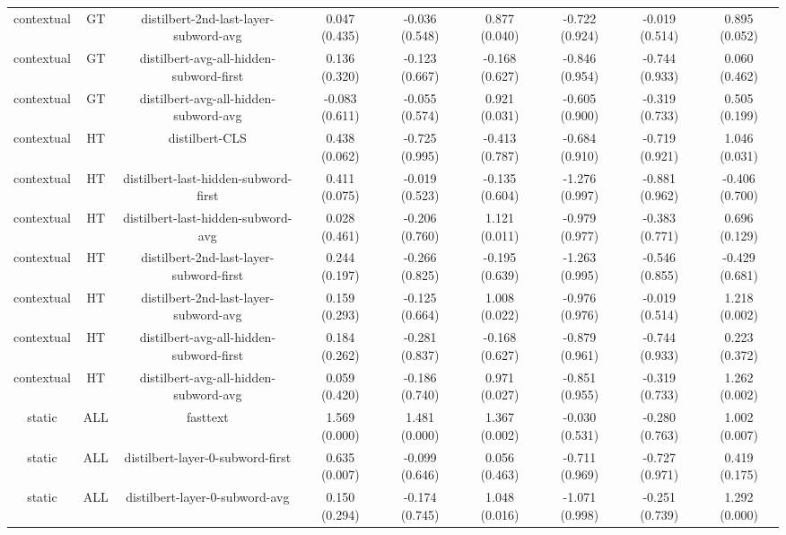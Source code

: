 \begin{sidewaystable}[htb]
\begin{tabular}{@{}ccccccccc@{}}
        contextual & GT & distilbert-2nd-last-layer-subword-avg & 0.047 (0.435) & -0.036 (0.548) & 0.877 (0.040) & -0.722 (0.924) & -0.019 (0.514) & 0.895 (0.052) \\
        contextual & GT & distilbert-avg-all-hidden-subword-first & 0.136 (0.320) & -0.123 (0.667) & -0.168 (0.627) & -0.846 (0.954) & -0.744 (0.933) & 0.060 (0.462) \\
        contextual & GT & distilbert-avg-all-hidden-subword-avg & -0.083 (0.611) & -0.055 (0.574) & 0.921 (0.031) & -0.605 (0.900) & -0.319 (0.733) & 0.505 (0.199) \\
        contextual & HT & distilbert-CLS & 0.438 (0.062) & -0.725 (0.995) & -0.413 (0.787) & -0.684 (0.910) & -0.719 (0.921) & 1.046 (0.031) \\
        contextual & HT & distilbert-last-hidden-subword-first & 0.411 (0.075) & -0.019 (0.523) & -0.135 (0.604) & -1.276 (0.997) & -0.881 (0.962) & -0.406 (0.700) \\
        contextual & HT & distilbert-last-hidden-subword-avg & 0.028 (0.461) & -0.206 (0.760) & 1.121 (0.011) & -0.979 (0.977) & -0.383 (0.771) & 0.696 (0.129) \\
        contextual & HT & distilbert-2nd-last-layer-subword-first & 0.244 (0.197) & -0.266 (0.825) & -0.195 (0.639) & -1.263 (0.995) & -0.546 (0.855) & -0.429 (0.681) \\
        contextual & HT & distilbert-2nd-last-layer-subword-avg & 0.159 (0.293) & -0.125 (0.664) & 1.008 (0.022) & -0.976 (0.976) & -0.019 (0.514) & 1.218 (0.002) \\
        contextual & HT & distilbert-avg-all-hidden-subword-first & 0.184 (0.262) & -0.281 (0.837) & -0.168 (0.627) & -0.879 (0.961) & -0.744 (0.933) & 0.223 (0.372) \\
        contextual & HT & distilbert-avg-all-hidden-subword-avg & 0.059 (0.420) & -0.186 (0.740) & 0.971 (0.027) & -0.851 (0.955) & -0.319 (0.733) & 1.262 (0.002) \\
        static & ALL & fasttext & 1.569 (0.000) & 1.481 (0.000) & 1.367 (0.002) & -0.030 (0.531) & -0.280 (0.763) & 1.002 (0.007) \\
        static & ALL & distilbert-layer-0-subword-first & 0.635 (0.007) & -0.099 (0.646) & 0.056 (0.463) & -0.711 (0.969) & -0.727 (0.971) & 0.419 (0.175) \\
        static & ALL & distilbert-layer-0-subword-avg & 0.150 (0.294) & -0.174 (0.745) & 1.048 (0.016) & -1.071 (0.998) & -0.251 (0.739) & 1.292 (0.000) \\

\end{tabular}
\end{sidewaystable}
